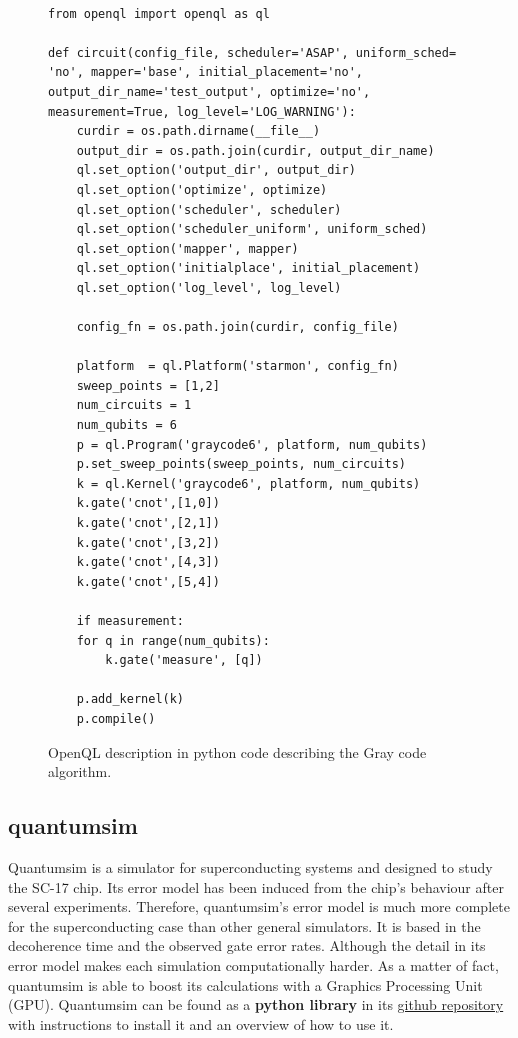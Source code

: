 \begin{figure}
\centering
\begin{minipage}{\textwidth}

\begin{verbatim}

from openql import openql as ql

def circuit(config_file, scheduler='ASAP', uniform_sched= 'no', mapper='base', initial_placement='no', output_dir_name='test_output', optimize='no', measurement=True, log_level='LOG_WARNING'):
    curdir = os.path.dirname(__file__)
    output_dir = os.path.join(curdir, output_dir_name)
    ql.set_option('output_dir', output_dir)
    ql.set_option('optimize', optimize)
    ql.set_option('scheduler', scheduler)
    ql.set_option('scheduler_uniform', uniform_sched)
    ql.set_option('mapper', mapper)
    ql.set_option('initialplace', initial_placement)
    ql.set_option('log_level', log_level)

    config_fn = os.path.join(curdir, config_file)

    platform  = ql.Platform('starmon', config_fn)
    sweep_points = [1,2]
    num_circuits = 1
    num_qubits = 6
    p = ql.Program('graycode6', platform, num_qubits)
    p.set_sweep_points(sweep_points, num_circuits)
    k = ql.Kernel('graycode6', platform, num_qubits)
    k.gate('cnot',[1,0])
    k.gate('cnot',[2,1])
    k.gate('cnot',[3,2])
    k.gate('cnot',[4,3])
    k.gate('cnot',[5,4])

    if measurement:
	for q in range(num_qubits):
	    k.gate('measure', [q])

    p.add_kernel(k)
    p.compile()

\end{verbatim}

\caption{OpenQL description in python code describing the Gray code algorithm.}
\label{code:openql_gray_code}
\end{minipage}
\end{figure}

\subsection{quantumsim}
\label{sec:org96b0d71}

Quantumsim \cite{O_Brien_2017} is a simulator for superconducting systems and designed to study the SC-17 chip.
Its error model has been induced from the chip's behaviour after several experiments.
Therefore, quantumsim's error model is much more complete for the superconducting case than other general simulators.
It is based in the decoherence time and the observed gate error rates.
Although the detail in its error model makes each simulation computationally harder.
As a matter of fact, quantumsim is able to boost its calculations with a Graphics Processing Unit (GPU).
Quantumsim can be found as a \textbf{python library} in its \href{https://github.com/quantumsim/quantumsim}{github repository} with instructions to install it and an overview of how to use it.

